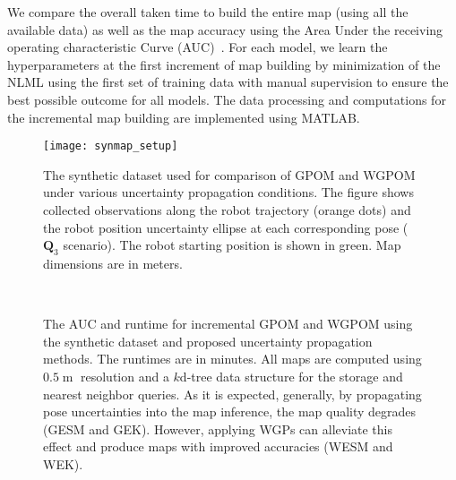 \documentclass[letterpaper, 10 pt, journal, twoside]{IEEEtran}  %
\newcommand{\m}{\mathop{\mathrm{m}}}
\begin{document}
We compare the overall taken time to build the entire map (using all the available data) as well as the map accuracy using the Area Under the receiving operating characteristic Curve (AUC)~\cite{fawcett2006introduction}. For each model, we learn the hyperparameters at the first increment of map building by minimization of the NLML using the first set of training data with manual supervision to ensure the best possible outcome for all models. The data processing and computations for the incremental map building are implemented using MATLAB.

\begin{figure}[!t]
  \centering  
    \texttt{[image: synmap\_setup]}
  \caption{The synthetic dataset used for comparison of GPOM and WGPOM under various uncertainty propagation conditions. The figure shows collected observations along the robot trajectory (orange dots) and the robot position uncertainty ellipse at each corresponding pose ($\boldsymbol Q_3$ scenario). The robot starting position is shown in green. Map dimensions are in meters.}
  \label{fig:synmap_setup}
\end{figure}

\begin{figure}
  \centering  
  \\
  \caption{The AUC and runtime for incremental GPOM and WGPOM using the synthetic dataset and proposed uncertainty propagation methods. The runtimes are in minutes. All maps are computed using $0.5\m$ resolution and a $k$d-tree data structure for the storage and nearest neighbor queries. As it is expected, generally, by propagating pose uncertainties into the map inference, the map quality degrades (GESM and GEK). However, applying WGPs can alleviate this effect and produce maps with improved accuracies (WESM and WEK).}
  \label{fig:synmap_qplot}
\end{figure}
\end{document}
